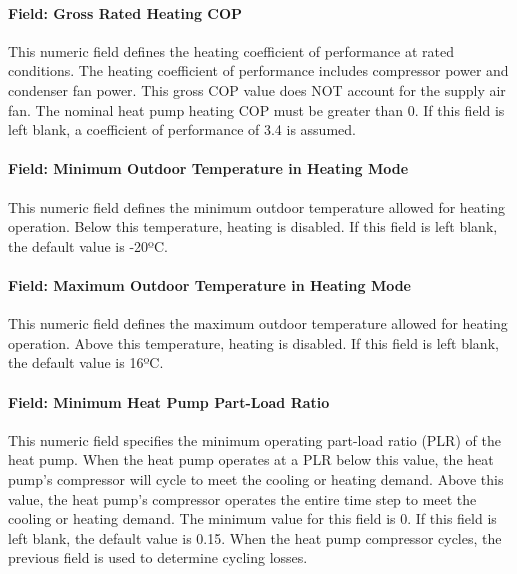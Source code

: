\paragraph{Field: Gross Rated Heating COP}\label{field-gross-rated-heating-cop-000}

This numeric field defines the heating coefficient of performance at rated conditions. The heating coefficient of performance includes compressor power and condenser fan power. This gross COP value does NOT account for the supply air fan. The nominal heat pump heating COP must be greater than 0. If this field is left blank, a coefficient of performance of 3.4 is assumed.

\paragraph{Field: Minimum Outdoor Temperature in Heating Mode}\label{field-minimum-outdoor-temperature-in-heating-mode}

This numeric field defines the minimum outdoor temperature allowed for heating operation. Below this temperature, heating is disabled. If this field is left blank, the default value is -20ºC.

\paragraph{Field: Maximum Outdoor Temperature in Heating Mode}\label{field-maximum-outdoor-temperature-in-heating-mode}

This numeric field defines the maximum outdoor temperature allowed for heating operation. Above this temperature, heating is disabled. If this field is left blank, the default value is 16ºC.

\paragraph{Field: Minimum Heat Pump Part-Load Ratio}\label{field-minimum-heat-pump-part-load-ratio}

This numeric field specifies the minimum operating part-load ratio (PLR) of the heat pump. When the heat pump operates at a PLR below this value, the heat pump's compressor will cycle to meet the cooling or heating demand. Above this value, the heat pump's compressor operates the entire time step to meet the cooling or heating demand. The minimum value for this field is 0. If this field is left blank, the default value is 0.15. When the heat pump compressor cycles, the previous field is used to determine cycling losses.

